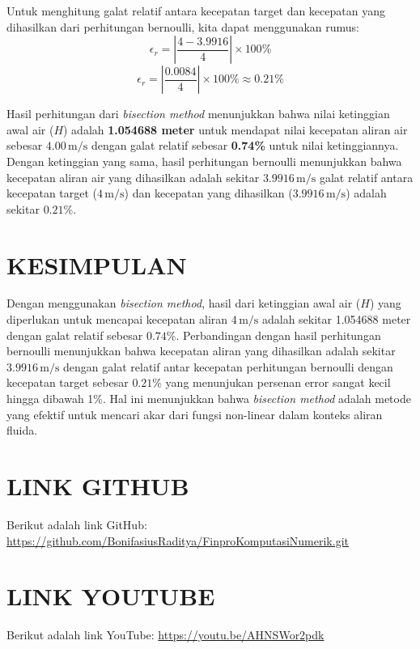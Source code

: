 \documentclass[conference]{IEEEtran}
\begin{document}
Untuk menghitung galat relatif antara kecepatan target dan kecepatan yang dihasilkan dari perhitungan bernoulli, kita dapat menggunakan rumus:
\begin{equation}
\epsilon_r = \left| \frac{4 - 3.9916}{4} \right| \times 100\%
\end{equation}
\begin{equation}
\epsilon_r = \left| \frac{0.0084}{4} \right| \times 100\% \approx 0.21\%
\end{equation}

Hasil perhitungan dari \textit{bisection method} menunjukkan bahwa nilai ketinggian awal air ($H$) adalah \textbf{1.054688 meter} untuk mendapat nilai kecepatan aliran air sebesar $4.00 \, \text{m/s}$ dengan galat relatif sebesar \textbf{0.74\%} untuk nilai ketinggiannya. Dengan ketinggian yang sama, hasil perhitungan bernoulli menunjukkan bahwa kecepatan aliran air yang dihasilkan adalah sekitar $3.9916 \, \text{m/s}$ galat relatif antara kecepatan target ($4 \, \text{m/s}$) dan kecepatan yang dihasilkan ($3.9916 \, \text{m/s}$) adalah sekitar $0.21\%$. \\

\section{KESIMPULAN}
Dengan menggunakan \textit{bisection method}, hasil dari ketinggian awal air ($H$) yang diperlukan untuk mencapai kecepatan aliran $4 \, \text{m/s}$ adalah sekitar 1.054688 meter dengan galat relatif sebesar $0.74\%$. Perbandingan dengan hasil perhitungan bernoulli menunjukkan bahwa kecepatan aliran yang dihasilkan adalah sekitar $3.9916 \, \text{m/s}$ dengan galat relatif antar kecepatan perhitungan bernoulli dengan kecepatan target sebesar $0.21\%$ yang menunjukan persenan error sangat kecil hingga dibawah 1\%. Hal ini menunjukkan bahwa \textit{bisection method} adalah metode yang efektif untuk mencari akar dari fungsi non-linear dalam konteks aliran fluida. \\

\section{LINK GITHUB}
Berikut adalah link GitHub:
\url{https://github.com/BonifasiusRaditya/FinproKomputasiNumerik.git} \\

\section{LINK YOUTUBE}
Berikut adalah link YouTube:
\url{https://youtu.be/AHNSWor2pdk} \\
\end{document}
